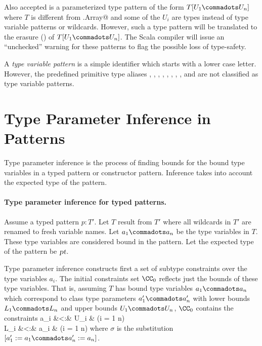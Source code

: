 Also accepted is a parameterized type pattern of the form $T[U_1
\commadots U_n]$ where $T$ is different from \lstinline@scala.Array@
and some of the $U_i$ are types instead of type variable patterns or
wildcards. However, such a type pattern will be translated to the
erasure () of $T[U_1 \commadots U_n]$.  The Scala
compiler will issue an ``unchecked'' warning for these patterns to
flag the possible loss of type-safety.

A {\em type variable pattern} is a simple identifier which starts with
a lower case letter. However, the predefined primitive type aliases
\lstinline@unit@, \lstinline@boolean@, \lstinline@byte@,
\lstinline@short@, \lstinline@char@, \lstinline@int@,
\lstinline@long@, \lstinline@float@, and \lstinline@double@ are not
classified as type variable patterns.

\section{Type Parameter Inference in Patterns}\label{sec:type-param-inf-pat}

Type parameter inference is the process of finding bounds for the
bound type variables in a typed pattern or constructor
pattern. Inference takes into account the expected type of the
pattern.

\paragraph{Type parameter inference for typed patterns.}
Assume a typed pattern $p: T'$. Let $T$ result from $T'$ where all wildcards in
$T'$ are renamed to fresh variable names.  Let $a_1 \commadots a_n$ be
the type variables in $T$. These type variables are considered bound
in the pattern. Let the expected type of the pattern be $\mbox{\sl pt}$.

Type parameter inference constructs first a set of subtype constraints over
the type variables $a_i$. The initial constraints set $\CC_0$ reflects
just the bounds of these type variables. That is, assuming $T$ has
bound type variables $a_1 \commadots a_n$ which correspond to class
type parameters $a'_1 \commadots a'_n$ with lower bounds $L_1
\commadots L_n$ and upper bounds $U_1 \commadots U_n$, $\CC_0$
contains the constraints  a_i &<:& \sigma U_i & \gap (i = 1
\commadots n)\\ \sigma L_i &<:& a_i & \gap (i = 1 \commadots n) \eda
where $\sigma$ is the substitution $[a'_1 := a_1 \commadots a'_n :=
a_n]$.

